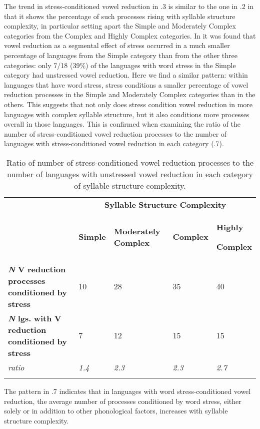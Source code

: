   The trend in stress-conditioned vowel reduction in .3 is similar to the one in .2 in that it shows the percentage of such processes rising with syllable structure complexity, in particular setting apart the Simple and Moderately Complex categories from the Complex and Highly Complex categories. In  it was found that vowel reduction as a segmental effect of stress occurred in a much smaller percentage of languages from the Simple category than from the other three categories: only 7/18 (39\%) of the languages with word stress in the Simple category had unstressed vowel reduction. Here we find a similar pattern: within languages that have word stress, stress conditions a smaller percentage of vowel reduction processes in the Simple and Moderately Complex categories than in the others. This suggests that not only does stress condition vowel reduction in more languages with complex syllable structure, but it also conditions more processes overall in those languages. This is confirmed when examining the ratio of the number of stress-conditioned vowel reduction processes to the number of languages with stress-conditioned vowel reduction in each category (.7).

\begin{table}
\begin{tabularx}{\textwidth}{XXXXX}
\lsptoprule
 & \multicolumn{4}{c}{ \textbf{Syllable} \textbf{Structure} \textbf{Complexity}}\\
& \textbf{Simple} & \textbf{Moderately} \textbf{Complex} & \textbf{Complex} & { \textbf{Highly} }

 \textbf{Complex}\\
 \textbf{\textit{N}} \textbf{V} \textbf{reduction} \textbf{processes} \textbf{conditioned} \textbf{by} \textbf{stress} & 10 & 28 & 35 & 40\\
 \textbf{\textit{N}} \textbf{lgs.} \textbf{with} \textbf{V} \textbf{reduction} \textbf{conditioned} \textbf{by} \textbf{stress} & 7 & 12 & 15 & 15\\
 \textit{ratio} & \textit{1.4} & \textit{2.3} & \textit{2.3} & \textit{2.7}\\
\lspbottomrule
\end{tabularx}
\caption{\label{6.7}Ratio of number of stress-conditioned vowel reduction processes to the number of languages with unstressed vowel reduction in each category of syllable structure complexity.}
\end{table}

  The pattern in .7 indicates that in languages with word stress-conditioned vowel reduction, the average number of processes conditioned by word stress, either solely or in addition to other phonological factors, increases with syllable structure complexity.

